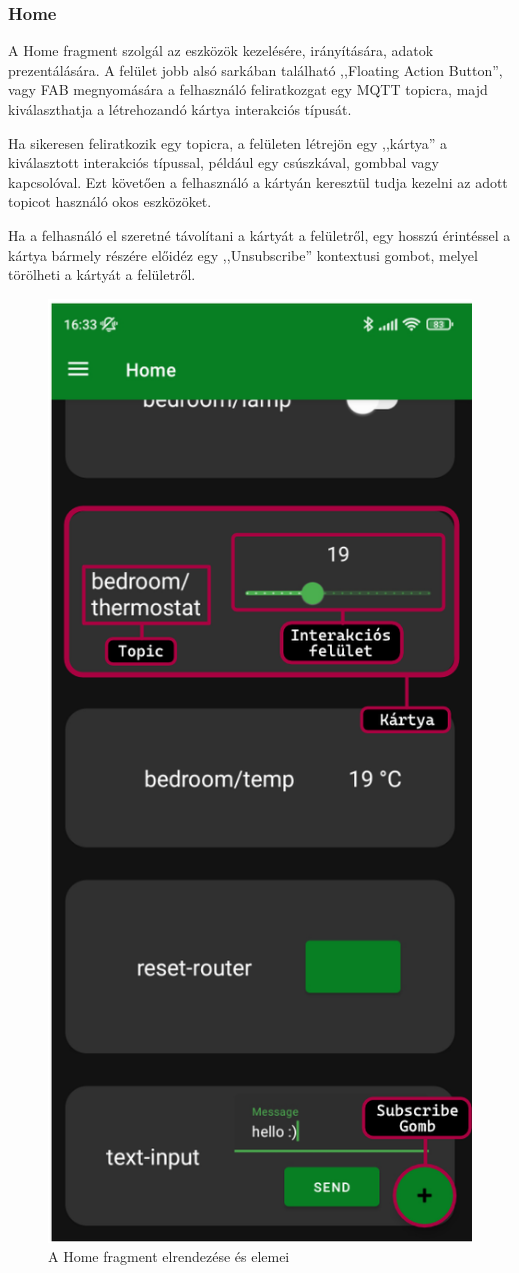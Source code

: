 \documentclass[
]{thesis-ekf}
\theoremstyle{definition}
\theoremstyle{remark}
\begin{document}
\subsubsection{Home}
A Home fragment szolgál az eszközök kezelésére, irányítására, adatok prezentálására.
A felület jobb alsó sarkában található ,,Floating Action Button'', vagy FAB megnyomására a felhasználó feliratkozgat egy MQTT
topicra, majd kiválaszthatja a létrehozandó kártya interakciós típusát. 

Ha sikeresen feliratkozik egy topicra, a felületen létrejön
egy ,,kártya'' a kiválasztott interakciós típussal, például egy csúszkával, gombbal vagy kapcsolóval. Ezt követően a felhasználó a
kártyán keresztül tudja kezelni az adott topicot használó okos eszközöket. 

Ha a felhasnáló el szeretné távolítani a kártyát a felületről,
egy hosszú érintéssel a kártya bármely részére előidéz egy ,,Unsubscribe'' kontextusi gombot, melyel törölheti a kártyát a felületről.

\begin{figure}[H]
	\centering
	\includegraphics[width=0.5\linewidth]{images/home_anatomy.png}
	\caption{A Home fragment elrendezése és elemei}
	\label{fig_home_anatomy}
\end{figure}
	
\end{document}
